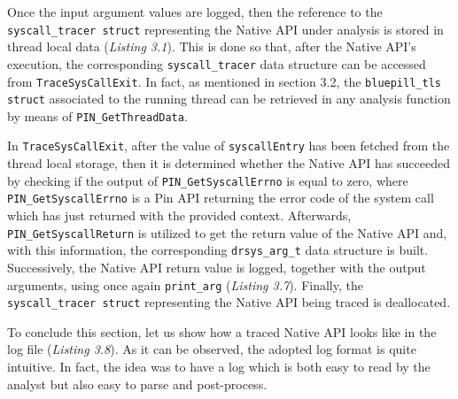 Once the input argument values are logged, then the reference to the \texttt{syscall\_tracer struct} representing the Native API under analysis is stored in thread local data (\textit{Listing 3.1}). This is done so that, after the Native API's execution, the corresponding \texttt{syscall\_tracer} data structure can be accessed from \texttt{TraceSysCallExit}. In fact, as mentioned in section 3.2, the \texttt{bluepill\_tls struct} associated to the running thread can be retrieved in any analysis function by means of \texttt{PIN\_GetThreadData}.

In \texttt{TraceSysCallExit}, after the value of \texttt{syscallEntry} has been fetched from the thread local storage, then it is determined whether the Native API has succeeded by checking if the output of \texttt{PIN\_GetSyscallErrno} is equal to zero, where \texttt{PIN\_GetSyscallErrno} is a Pin API returning the error code of the system call which has just returned with the provided context. Afterwards, \texttt{PIN\_GetSyscallReturn} is utilized to get the return value of the Native API and, with this information, the corresponding \texttt{drsys\_arg\_t} data structure is built. Successively, the Native API return value is logged, together with the output arguments, using once again \texttt{print\_arg} (\textit{Listing 3.7}). Finally, the \texttt{syscall\_tracer struct} representing the Native API being traced is deallocated.

To conclude this section, let us show how a traced Native API looks like in the log file (\textit{Listing 3.8}). As it can be observed, the adopted log format is quite intuitive. In fact, the idea was to have a log which is both easy to read by the analyst but also easy to parse and post-process.      
\\

